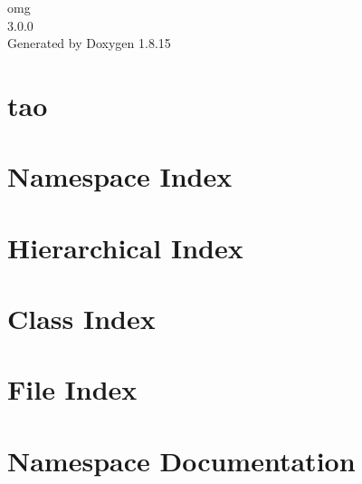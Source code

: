 \let\mypdfximage\pdfximage\def\pdfximage{\immediate\mypdfximage}\documentclass[twoside]{book}
\newcommand{\+}{\discretionary{\mbox{\scriptsize$\hookleftarrow$}}{}{}}
\newcommand{\clearemptydoublepage}{%
  \newpage{\pagestyle{empty}\cleardoublepage}%
}
\begin{document}
\hypersetup{pageanchor=false,
             bookmarksnumbered=true,
             pdfencoding=unicode
            }
\begin{titlepage}
\vspace*{7cm}
\begin{center}%
{\Large omg \\[1ex]\large 3.\+0.\+0 }\\
\vspace*{1cm}
{\large Generated by Doxygen 1.8.15}\\
\end{center}
\end{titlepage}
\clearemptydoublepage
{}
\tableofcontents
\clearemptydoublepage
{}
\hypersetup{pageanchor=true}

\chapter{tao}
\label{md__home_vitorgreati_git-repos_omg_sources_extern_tao__r_e_a_d_m_e}

\chapter{Namespace Index}

\chapter{Hierarchical Index}

\chapter{Class Index}

\chapter{File Index}

\chapter{Namespace Documentation}


\end{document}
